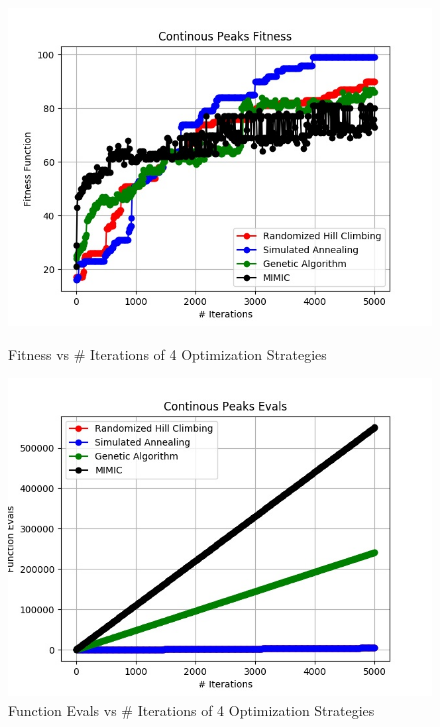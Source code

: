 \documentclass[h]{article}
\begin{document}
 \begin{figure}[H]
      \includegraphics[width=1\textwidth,keepaspectratio]{continous_peaks_fitness.jpg} 
      \caption*{Fitness vs # Iterations of 4 Optimization Strategies} 
   \endminipage\hfill
      \includegraphics[width=1\textwidth,keepaspectratio]{continous_peaks_evals.jpg} 
      \caption*{Function Evals vs # Iterations of 4 Optimization Strategies} 
   \endminipage\hfill

\end{figure}
\end{document}
